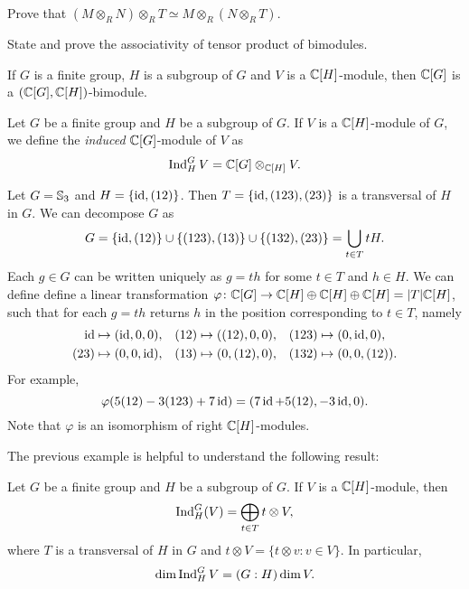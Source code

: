 \begin{exercise}
    Prove that  $(M\otimes_R N)\otimes_RT\simeq M\otimes_R (N\otimes_RT)$.
\end{exercise}

\begin{exercise}
    State and prove the associativity of tensor product of bimodules. 
\end{exercise}


If $G$ is a finite group, $H$ is a subgroup of $G$
and $V$ is a $\mathbb{C}[H]$-module, then  
$\mathbb{C}[G]$ is a $(\mathbb{C}[G],\mathbb{C}[H])$-bimodule.

\begin{definition}
Let $G$ be a finite group and  
$H$ be a subgroup of $G$. 
If $V$ is a $\mathbb{C}[H]$-module of $G$, 
we define the \emph{induced} $\mathbb{C}[G]$-module of $V$ 
as 
\[
\operatorname{Ind}_H^GV=\mathbb{C}[G]\otimes_{\mathbb{C}[H]}V.
\]
\end{definition}


\begin{example}
Let $G=\mathbb{S}_3$ and $H=\{\operatorname{id},(12)\}$. Then 
$T=\{\operatorname{id},(123),(23)\}$ is a transversal of $H$ in $G$. We can decompose $G$ as 
\[
G=\{\operatorname{id},(12)\}\cup \{(123),(13)\}\cup\{(132),(23)\}=\bigcup_{t\in T}tH.
\]
Each $g\in G$ can be written uniquely as $g=th$ for some $t\in T$ and $h\in H$. We can define define a linear transformation 
$\varphi\colon \mathbb{C}[G]\to \mathbb{C}[H]\oplus \mathbb{C}[H]\oplus \mathbb{C}[H]=|T|\mathbb{C}[H]$, such that for each $g=th$ returns $h$ in the position corresponding to $t\in T$, namely 
\begin{align*}
\operatorname{id}&\mapsto (\operatorname{id},0,0), && (12)\mapsto ((12),0,0), && (123)\mapsto (0,\operatorname{id},0),\\
(23)&\mapsto (0,0,\operatorname{id}), && (13)\mapsto (0,(12),0), && (132)\mapsto (0,0,(12)).
\end{align*}
For example, 
\[
\varphi( 5(12)-3(123)+7\operatorname{id} )=(7\operatorname{id}+5(12),-3\operatorname{id},0).
\]
Note that $\varphi$ is an isomorphism of right $\mathbb{C}[H]$-modules. 
\end{example}

The previous example is helpful 
to understand the following 
result:

\begin{proposition}
Let $G$ be a finite group and 
$H$ be a subgroup of $G$. If $V$ is a $\mathbb{C}[H]$-module, then  
\[
    \operatorname{Ind}_H^G(V)=\bigoplus_{t\in T}t\otimes V,
\]
where $T$ is a transversal of $H$ in $G$ and $t\otimes V=\{t\otimes v:v\in V\}$. In particular, 
\[
\dim\operatorname{Ind}_H^GV=(G:H)\dim V.
\]
\end{proposition}

